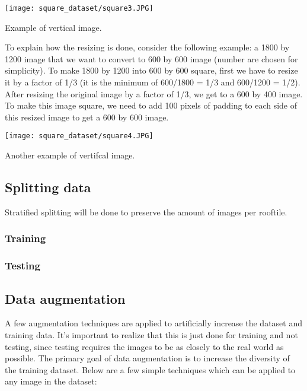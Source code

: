 \begin{marginfigure} %
	\texttt{[image: square\_dataset/square3.JPG]}
	\caption{Example of vertical image.}
\end{marginfigure}

To explain how the resizing is done, consider the following example: a 1800 by 1200 image that we want to convert to 600 by 600 image (number are chosen for simplicity). To make 1800 by 1200 into 600 by 600 square, first we have to resize it by a factor of 1/3 (it is the minimum of 600/1800 = 1/3 and 600/1200 = 1/2). After resizing the original image by a factor of 1/3, we get to a 600 by 400 image. To make this image square, we need to add 100 pixels of padding to each side of this resized image to get a 600 by 600 image.


\begin{marginfigure} %
	\texttt{[image: square\_dataset/square4.JPG]}
	\caption{Another example of vertifcal image.}
\end{marginfigure}


\newpage
\subsection{Splitting data}

\begin{fullwidth}
	Stratified splitting will be done to preserve the amount of images per rooftile.
\end{fullwidth}
\subsubsection{Training}

\subsubsection{Testing}


\subsection{Data augmentation}
A few augmentation techniques are applied to artificially increase the dataset and training data. 
It's important to realize that this is just done for training and not testing, 
since testing requires the images to be as closely to the real world as possible. 
The primary goal of data augmentation is to increase the diversity of the training dataset. 
Below are a few simple techniques which can be applied to any image in the dataset:

